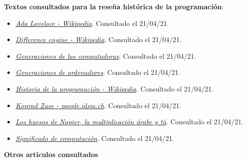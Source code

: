 \documentclass[
]{book}
\providecommand{\tightlist}{%
  \setlength{\itemsep}{0pt}\setlength{\parskip}{0pt}}
\begin{document}
\textbf{Textos consultados para la reseña histórica de la programación}:

\begin{itemize}
\tightlist
\item
  \href{https://es.wikipedia.org/wiki/Ada_Lovelace}{\emph{Ada Lovelace - Wikipedia}}. Consultado el 21/04/21.
\item
  \href{https://en.wikipedia.org/wiki/Difference_engine}{\emph{Difference engine - Wikipedia}}. Consultado el 21/04/21.
\item
  \href{https://www.nextu.com/blog/generaciones-de-las-computadoras/}{\emph{Generaciones de las computadoras}}. Consultado el 21/04/21.
\item
  \href{https://www.profesionalreview.com/2018/10/13/generaciones-de-ordenadores/}{\emph{Generaciones de ordenadores}}. Consultado el 21/04/21.
\item
  \href{https://es.wikipedia.org/wiki/Anexo:Historia_de_la_computaci\%C3\%B3n}{\emph{Historia de la programación - Wikipedia}}. Consultado el 21/04/21.
\item
  \href{https://people.idsia.ch/~juergen/zuse.html}{\emph{Konrad Zuse - people.idsia.ch}}. Consultado el 21/04/21.
\item
  \href{https://culturacientifica.com/2016/10/05/los-huesos-napier-la-multiplicacion-arabe/\#:~:text=Los\%20huesos\%20de\%20Napier\%2C\%20tambi\%C3\%A9n,de\%20las\%20tablas\%20de\%20multiplicar}{\emph{Los huesos de Napier, la multiplicación árabe y tú}}. Consultado el 21/04/21.
\item
  \href{https://www.significados.com/computacion/}{\emph{Significado de computación}}. Consultado el 21/04/21.
\end{itemize}

\textbf{Otros artículos consultados}
\end{document}
